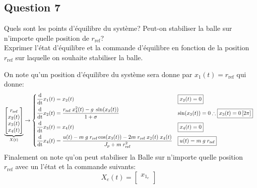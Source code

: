 \documentclass[class=article, crop=false]{standalone}
\begin{document}
\subsection{Question 7}
\begin{exercise}
    Quels sont les points d'équilibre du système? Peut-on stabiliser la balle sur n'importe quelle position de $r_{\text{ref}}$?\\
    
Exprimer l'état d'équilibre et la commande d'équilibre en fonction de la position $r_{\text{ref}}$ sur laquelle on souhaite stabiliser la balle.
\end{exercise}
\begin{resolution}
    On note qu'un position d'équilibre du système sera donne par $x_1(t) = r_{\text{ref}}$ qui donne:
    \begin{equation*}
        \underbrace{
        \begin{bmatrix}
            r_{\text{ref}}\\
            x_2(t)\\
            x_3(t)\\
            x_4(t)\\
        \end{bmatrix}}_{X(t)}
        \to
        \begin{dcases}
            \frac{\text{d}}{\text{dt}} x_1(t) = x_2(t) & 
            \boxed{x_2(t) = 0}
            \\
            \frac{\text{d}}{\text{dt}} x_2(t) = \frac{ r_{\text{ref}} \; x^2_4(t) - g \; \sin(x_3(t))}{1 + \sigma} & 
            \sin(x_3(t)) = 0 \therefore \boxed{x_3(t) = 0\,[2\pi]}
            \\
            \frac{\text{d}}{\text{dt}} x_3(t) = x_4(t) & 
            \boxed{x_4(t) = 0}
            \\
            \frac{\text{d}}{\text{dt}} x_4(t) = \frac{u(t) - m \; g \; r_{\text{ref}} \cos(x_3(t)) - 2 m \; r_{\text{ref}} \; x_2(t) \; x_4(t)}{J_p + m \; r_{\text{ref}}^2} & 
            \boxed{u(t) = m \; g \; r_{\text{ref}}}
            \\
        \end{dcases}
    \end{equation*}
    Finalement on note qu'on peut stabiliser la Balle sur n'importe quelle position $r_{\text{ref}}$ avec un l'état et la commande suivants:
    \begin{equation}
        X_e(t) = 
        \begin{bmatrix}
            x_{1_e}\\

\end{bmatrix}
\end{equation}
\end{resolution}
\end{document}
